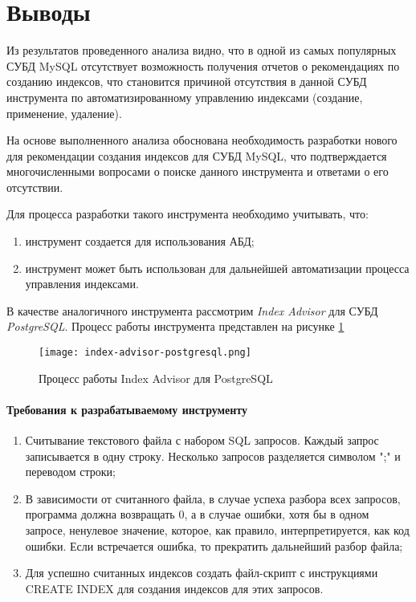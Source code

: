 \section{Выводы}

Из результатов проведенного анализа видно, что в одной из самых популярных СУБД MySQL отсутствует возможность получения отчетов о рекомендациях по созданию индексов, что становится причиной отсутствия в данной СУБД инструмента по автоматизированному управлению индексами (создание, применение, удаление).

На основе выполненного анализа обоснована необходимость разработки нового  для рекомендации создания индексов для СУБД MySQL, что подтверждается многочисленными вопросами о поиске данного инструмента и ответами о его отсутствии. \cite{stackoverflow.com:as_mssql_tuning_advisor,stackoverflow.com:automatic-index-creation,stackoverflow.com:help-me-optimise-my-queries-and-index-settings,stackoverflow.com:auto-build-indexes,experts-exchange.com:as_engine_tuning_advisor} 

Для процесса разработки такого инструмента необходимо учитывать, что:
\begin{enumerate}
\item инструмент создается для использования АБД;
\item инструмент может быть использован для дальнейшей автоматизации процесса управления индексами.
\end{enumerate}

В качестве аналогичного инструмента рассмотрим \textit{Index Advisor} для СУБД \textit{PostgreSQL}. Процесс работы инструмента представлен на рисунке \ref{img:index_advisor_postgresql}

\begin{figure}[H]
  \centering
  \texttt{[image: index-advisor-postgresql.png]}
  \caption{Процесс работы Index Advisor для PostgreSQL}
  \label{img:index_advisor_postgresql}
\end{figure}

\paragraph{Требования к разрабатываемому инструменту}
\begin{enumerate}
\item Считывание текстового файла с набором SQL запросов. Каждый запрос записывается в одну строку. Несколько запросов разделяется символом ";" и переводом строки;
\item В зависимости от считанного файла, в случае успеха разбора всех запросов, программа должна возвращать 0, а в случае ошибки, хотя бы в одном запросе, ненулевое значение, которое, как правило, интерпретируется, как код ошибки. Если встречается ошибка, то прекратить дальнейший разбор файла;
\item Для успешно считанных индексов создать файл-скрипт с инструкциями CREATE INDEX для создания индексов для этих запросов.
\end{enumerate}


